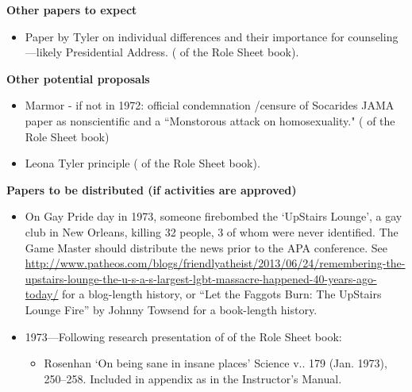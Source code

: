 \begin{refsection}
\textbf{Other papers to expect}

\begin{itemize}
\item Paper by Tyler on individual differences and their importance for counseling---likely Presidential Address. ( of the Role Sheet book).

\end{itemize}

\textbf{Other potential proposals}

\begin{itemize}
\item Marmor - if not in 1972: official condemnation \slash  censure of Socarides JAMA paper as nonscientific and a “Monstorous attack on homosexuality." ( of the Role Sheet book)

\item Leona Tyler principle ( of the Role Sheet book).

\end{itemize}

\textbf{Papers to be distributed (if activities are approved)}

\begin{itemize}
\item On Gay Pride day in 1973, someone firebombed the `UpStairs Lounge', a gay club in New Orleans, killing 32 people, 3 of whom were never identified. The Game Master should distribute the news prior to the APA conference. See \url{http://www.patheos.com/blogs/friendlyatheist/2013/06/24/remembering-the-upstairs-lounge-the-u-s-a-s-largest-lgbt-massacre-happened-40-years-ago-today/} for a blog-length history, or “Let the Faggots Burn: The UpStairs Lounge Fire” by Johnny Towsend for a book-length history.

\item 1973---Following research presentation of  of the Role Sheet book:

\begin{itemize}
\item Rosenhan `On being sane in insane places' Science v.. 179 (Jan. 1973), 250--258. Included in appendix as  in the Instructor's Manual.

\end{itemize}

\end{itemize}

\newpage


\end{refsection}
